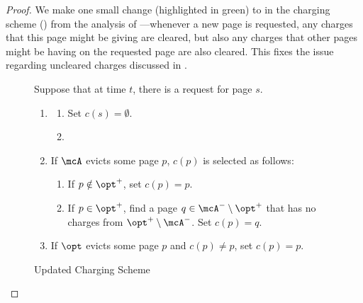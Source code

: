 \begin{proof}
    We make one small change (highlighted in green) to  in the charging scheme () from the analysis of \cite{lund1999paging}---whenever a new page is requested, any charges that this page might be giving are cleared, but also any charges that other pages might be having on the requested page are also cleared. This fixes the issue regarding uncleared charges discussed in .
    \begin{figure}[H]
        \begin{framed}
        Suppose that at time $t$, there is a request for page $s$.
            \vspace{-2mm}
                \begin{enumerate}
                    \item \label{item:updated-clear-charges} \begin{enumerate}
                        \item \label{item:updated-clear-charges-giving} Set $c(s)=\emptyset$.
                        \item \label{item:updated-clear-charges-bearing} 
                    \end{enumerate}
                    \item \label{item:updated-assign-charge} If $\mcA$ evicts some page $p$, $c(p)$ is selected as follows:
                    \begin{enumerate}
                        \item \label{item:updated-p-not-in-opt+} If $p \notin \opt^+$, set $c(p)=p$.
                        \item \label{item:updated-p-in-opt+} If $p \in \opt^+$, find a page $q \in \mcA^- \setminus \opt^+$ that has no charges from $\opt^+ \setminus \mcA^-$. Set $c(p)=q$.
                    \end{enumerate}
                    \item \label{item:updated-opt-eviction-charge-reassign} If $\opt$ evicts some page $p$ and $c(p) \neq p$, set $c(p)=p$.
                \end{enumerate}
            \vspace{-2mm}
        \end{framed}
        \vspace{-4mm}
        \caption{Updated Charging Scheme}
        \label{fig:updated-charging-scheme}

\end{figure}
\end{proof}
